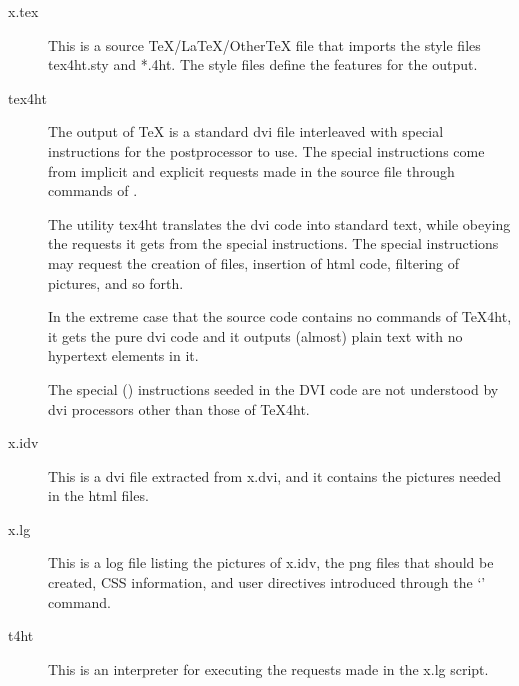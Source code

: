 \begin{description}
  \item[x.tex]

This is a source TeX/LaTeX/OtherTeX file that imports the style files tex4ht.sty and *.4ht. The style files define the features for the output.

\item[tex4ht]

The output of \TeX{} is a standard dvi file interleaved with special
instructions for the postprocessor  to use. The special
instructions come from implicit and explicit requests made in the source file
through commands of \texfourht.

The utility tex4ht translates the dvi code into standard text, while obeying
the requests it gets from the special instructions. The special instructions
may request the creation of files, insertion of html code, filtering of
pictures, and so forth.

In the extreme case that the source code contains no commands of \TeX4ht, it
gets the pure dvi code and it outputs (almost) plain text with no hypertext
elements in it.

The special (\texcommand{\special}) instructions seeded in the DVI code are not understood
by dvi processors other than those of \TeX4ht.

\item[x.idv]

This is a dvi file extracted from x.dvi, and it contains the pictures needed in
the html files.

\item[x.lg]

This is a log file listing the pictures of x.idv, the png files that should be
created, CSS information, and user directives introduced through the
‘’ command.

\item[t4ht]
This is an interpreter for executing the requests made in the x.lg script.

\end{description}

